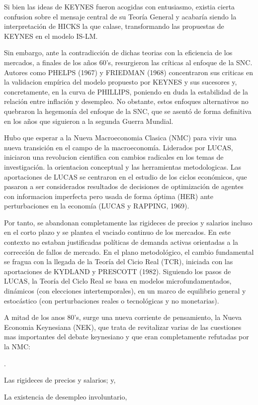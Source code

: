 \documentclass[10pt,a4paper]{article}
\newcounter{numitem}
\newenvironment{lnum}
      {\begin{list}{\arabic{numitem}.}{%
          \usecounter{numitem}%
          \setlength{\leftmargin}{1cm}%
          \setlength{\parskip}{3pt}%
          \setlength{\itemsep}{0pt}%
          \setlength{\parsep}{0pt}%
      }}
      {\end{list}}
\begin{document}
Si bien las ideas de KEYNES fueron acogidas con entusiasmo, existia cierta confusion sobre el mensaje central de su Teoría General y acabaría siendo la interpretación de HICKS la que calase, transformando las propuestas de KEYNES en el modelo IS-LM. 

Sin embargo, ante la contradicción de dichas teorias con la eficiencia de los mercados, a finales de los años 60's, resurgieron las críticas al enfoque de la SNC. Autores como PHELPS (1967) y FRIEDMAN (1968) concentraron sus criticas en la validacion empírica del modelo propuesto por KEYNES y sus sucesores y, concretamente, en la curva de PHILLIPS, poniendo en duda la estabilidad de la relación entre inflación y desempleo. No obstante, estos enfoques alternativos no quebraron la hegemonía del enfoque de la SNC, que se asentó de forma definitiva en los años que siguieron a la segunda Guerra Mundial.

Hubo que esperar a la Nueva Macroeconomia Clasica (NMC) para vivir una nueva transición en el campo de la macroeconomía. Liderados por LUCAS, iniciaron una revolucion cientifica con cambios radicales en los temas de investigación. la orientacion conceptual y las herramientas metodologicas. Las aportaciones de LUCAS se centraron en el estudio de los ciclos económicos, que pasaron a ser considerados resultados de decisiones de optimización de agentes con informacion imperfecta pero usada de forma óptima (HER) ante perturbaciones en la economía (LUCAS y RAPPING, 1969). 

Por tanto, se abandonan completamente las rigideces de precios y salarios incluso en el corto plazo y se plantea el vaciado continuo de los mercados. En este contexto no estaban justificadas políticas de demanda activas orientadas a la corrección de fallos de mercado. En el plano metodológico, el cambio fundamental se fragua con la llegada de la Teoría del Cicio Real (TCR), iniciada con las aportaciones de KYDLAND y PRESCOTT (1982). Siguiendo los pasos de LUCAS, la Teoría del Ciclo Real se basa en modelos microfundamentados, dinámicos (con elecciones intertemporales), en un marco de equilibrio general y estocástico (con perturbaciones reales o tecnológicas y no monetarias). 

A mitad de los anos 80's, surge una nueva corriente de pensamiento, la Nueva Economia Keynesiana (NEK), que trata de revitalizar varias de las cuestiones mas importantes del debate keynesiano y que eran completamente refutadas por la NMC:
\begin{lnum}
    \item Las rigideces de precios y salarios; y,
    \item La existencia de desempleo involuntario,
\end{lnum} 
\end{document}
